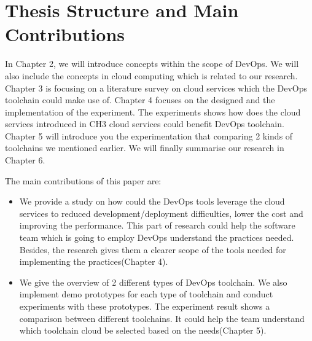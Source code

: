 \section{Thesis Structure and Main Contributions}
In Chapter 2, we will introduce concepts within the scope of DevOps. We will also include the concepts in cloud computing which is related to our research. Chapter 3 is focusing on a literature survey on cloud services which the DevOps toolchain could make use of. Chapter 4 focuses on the designed and the implementation of the experiment. The experiments shows how does the cloud services introduced in CH3 cloud services could benefit DevOps toolchain. Chapter 5 will introduce you the experimentation that comparing 2 kinds of toolchains we mentioned earlier. We will finally summarise our research in Chapter 6.
\par
The main contributions of this paper are:
\begin{itemize}
    \item We provide a study on how could the DevOps tools leverage the cloud services to reduced development/deployment difficulties, lower the cost and improving the performance. This part of research could help the software team which is going to employ DevOps understand the practices needed. Besides, the research gives them a clearer scope of the tools needed for implementing the practices(Chapter 4).
    \item We give the overview of 2 different types of DevOps toolchain. We also implement demo prototypes for each type of toolchain and conduct experiments with these prototypes. The experiment result shows a comparison between different toolchains. It could help the team understand which toolchain cloud be selected based on the needs(Chapter 5).
\end{itemize}